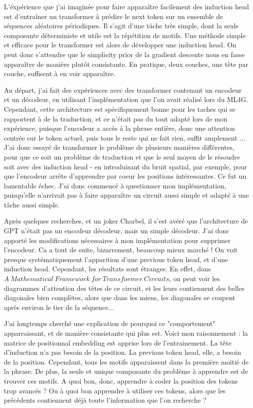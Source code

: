 \documentclass{article}
\begin{document}
L'éxpérience que j'ai imaginée pour faire apparaître facilement des induction head est d'entraîner un transformer à prédire le next token sur un ensemble de séquences aléatoires périodiques.
Il s'agit d'une tâche très simple, dont la seule composante déterministe et utile est la répétition de motifs. Une méthode simple et efficace pour le transformer est alors de développer une induction head. On peut donc s'attendre que le simplicity prior de la gradient descente nous en fasse apparaître de manière plutôt consistante. En pratique, deux couches, une tête par couche, suffisent à en voir apparaître.\newline

Au départ, j'ai fait des expériences avec des transformer contenant un encodeur et un décodeur, en utilisant l'implémentation que l'on avait réalisé lors du ML4G. Cependant, cette architecture est spécifiquement bonne pour les taches qui se rapportent à de la traduction, et ce n'était pas du tout adapté lors de mon expérience, puisque l'encodeur a accès à la phrase entière, donc une attention centrée sur le token actuel, puis tous le reste qui ne fait rien, suffit amplement ... J'ai donc essayé de transformer le problème de plusieurs manières différentes, pour que ce soit un problème de traduction et que le seul moyen de le résoudre soit avec des induction head - en introduisant du bruit spatial, par exemple, pour que l'encodeur arrête d'apprendre par coeur les positions intéressantes. Ce fut un lamentable échec.
J'ai donc commencé à questionner mon implémentation, puisqu'elle n'arrivait pas à faire apparaître un circuit aussi simple et adapté à une tâche aussi simple.

Après quelques recherches, et un joker Charbel, il s'est avéré que l'architecture de GPT n'était pas un encodeur décodeur, mais un simple décodeur. J'ai donc apporté les modifications nécessaires à mon implémentation pour supprimer l'encodeur. Ca a tout de suite, bizarrement, beaucoup mieux marché ! On voit presque systématiquement l'apparition d'une previous token head, et d'une induction head. Cependant, les résultats sont étranges. En effet, dans $A\ Mathematical\ Framework\ for\ Transformer\ Circuits$, on peut voir les diagrammes d'attention des têtes de ce circuit, et les leurs contiennent des belles diagonales bien complètes, alors que dans les miens, les diagonales se coupent après environ le tier de la séquence...

J'ai longtemps cherché une explication de pourquoi ce "comportement" apparraissant, et de manière consistante qui plus est. Voici mon raisonnement : la matrice de positionnal embedding est apprise lors de l'entrainement. La tête d'induction n'a pas besoin de la position. La previous token head, elle, a besoin de la position. Cependant, tous les motifs apparaissent dans la première moitié de la phrase. De plus, la seule et unique composante du problème à apprendre est de trouver ces motifs. A quoi bon, donc, apprendre à coder la position des tokens trop avancés ? Ou à quoi bon apprendre à utiliser ces tokens, alors que les précédents contiennent déjà toute l'information que l'on recherche ?
\end{document}
